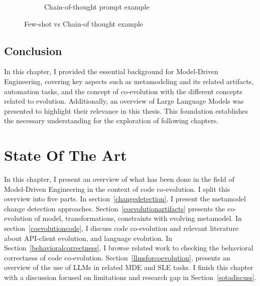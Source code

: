 \begin{itemize}
\begin{figure}[t!]
\begin{subfigure}[t]{0.5\linewidth}
			\caption{Chain-of-thought prompt example}
			\label{fig:cotexample}
		\end{subfigure}
		\caption{ Few-shot vs Chain-of thought example }
	\end{figure}
	
	
	
\end{itemize}
\section{Conclusion}
In this chapter, I provided the essential background for Model-Driven Engineering, covering key aspects such as metamodeling and its related artifacts, automation tasks, and the concept of co-evolution with the different concepts related to evolution. Additionally, an overview of Large Language Models was presented to highlight their relevance in this thesis. This foundation establishes the necessary understanding for the exploration of following chapters.

\chapter{State Of The Art}
\label{sota}
In this chapter, I present an overview of what has been done in the field of Model-Driven Engineering in the context of code co-evolution. I split this overview into five  parts. In section~\ref{changedetection}, I present the metamodel change detection approaches. Section~\ref{coevolutionartifacts} presents the co-evolution of model, transformations, constraints with evolving metamodel. In section~\ref{coevolutioncode}, I discuss code co-evolution and relevant literature about API-client evolution, and language evolution. In Section~\ref{behavioralcorrectness}, I browse related work to checking the behavioral correctness of code co-evolution. Section~\ref{llmsforcoevolution}, presents an overview of the use of LLMs in related MDE and SLE tasks. I finish this chapter with a discussion focused on limitations and research gap in Section~\ref{sotadiscuss}.

